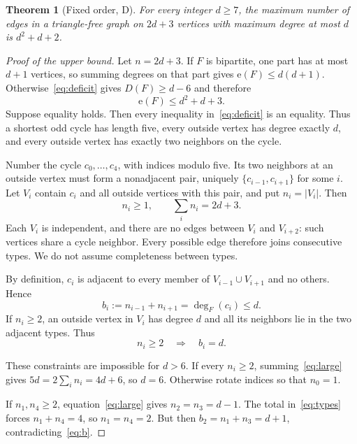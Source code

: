 \documentclass[11pt]{article}
\newtheorem{theorem}{Theorem}
\theoremstyle{remark}
\newcommand{\e}{\mathrm{e}}
\begin{document}
\begin{theorem}[Fixed order, D]\label{thm:order}
For every integer $d\ge7$, the maximum number of edges in a triangle-free graph on $2d+3$ vertices with maximum degree at most $d$ is $d^2+d+2$.
\end{theorem}
\begin{proof}[Proof of the upper bound]
Let $n=2d+3$. If $F$ is bipartite, one part has at most $d+1$ vertices, so summing degrees on that part gives $\e(F)\le d(d+1)$.
Otherwise~\eqref{eq:deficit} gives $D(F)\ge d-6$ and therefore
\begin{equation}\label{eq:oneedge}
\e(F)\le d^2+d+3.
\end{equation}
Suppose equality holds. Then every inequality in~\eqref{eq:deficit} is an equality. Thus a shortest odd cycle has length five, every outside vertex has degree exactly $d$, and every outside vertex has exactly two neighbors on the cycle.

Number the cycle $c_0,\ldots,c_4$, with indices modulo five. Its two neighbors at an outside vertex must form a nonadjacent pair, uniquely $\{c_{i-1},c_{i+1}\}$ for some $i$. Let $V_i$ contain $c_i$ and all outside vertices with this pair, and put $n_i=|V_i|$. Then
\begin{equation}\label{eq:types}
n_i\ge1,\qquad \sum_i n_i=2d+3.
\end{equation}
Each $V_i$ is independent, and there are no edges between $V_i$ and $V_{i+2}$: such vertices share a cycle neighbor. Every possible edge therefore joins consecutive types. We do not assume completeness between types.

By definition, $c_i$ is adjacent to every member of $V_{i-1}\cup V_{i+1}$ and no others. Hence
\begin{equation}\label{eq:b}
b_i:=n_{i-1}+n_{i+1}=\deg_F(c_i)\le d.
\end{equation}
If $n_i\ge2$, an outside vertex in $V_i$ has degree $d$ and all its neighbors lie in the two adjacent types. Thus
\begin{equation}\label{eq:large}
n_i\ge2\quad\Longrightarrow\quad b_i=d.
\end{equation}

These constraints are impossible for $d>6$. If every $n_i\ge2$, summing~\eqref{eq:large} gives $5d=2\sum_i n_i=4d+6$, so $d=6$. Otherwise rotate indices so that $n_0=1$.

If $n_1,n_4\ge2$, equation~\eqref{eq:large} gives $n_2=n_3=d-1$. The total in~\eqref{eq:types} forces $n_1+n_4=4$, so $n_1=n_4=2$. But then $b_2=n_1+n_3=d+1$, contradicting~\eqref{eq:b}.


\end{proof}
\end{document}
